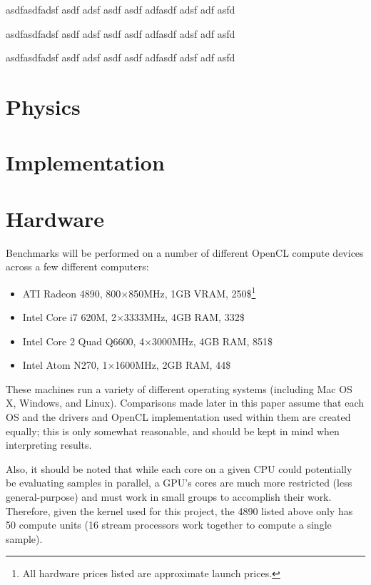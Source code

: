 \documentclass{acmsiggraph}
\begin{document}
asdfasdfadsf asdf adsf asdf asdf adfasdf adsf adf asfd

asdfasdfadsf asdf adsf asdf asdf adfasdf adsf adf asfd

asdfasdfadsf asdf adsf asdf asdf adfasdf adsf adf asfd

\section{Physics}

\section{Implementation}

\section{Hardware}

Benchmarks will be performed on a number of different OpenCL compute devices across a few different computers:

\begin{itemize}

\item ATI Radeon 4890, 800$\times$850MHz, 1GB VRAM, 250\$\footnote{All hardware prices listed are approximate launch prices.\label{fn:prices}}

\item Intel Core i7 620M, 2$\times$3333MHz, 4GB RAM, 332\$

\item Intel Core 2 Quad Q6600, 4$\times$3000MHz, 4GB RAM, 851\$

\item Intel Atom N270, 1$\times$1600MHz, 2GB RAM, 44\$

\end{itemize}

These machines run a variety of different operating systems (including Mac OS X, Windows, and Linux). Comparisons made later in this paper assume that each OS and the drivers and OpenCL implementation used within them are created equally; this is only somewhat reasonable, and should be kept in mind when interpreting results.

Also, it should be noted that while each core on a given CPU could potentially be evaluating samples in parallel, a GPU's cores are much more restricted (less general-purpose) and must work in small groups to accomplish their work. Therefore, given the kernel used for this project, the 4890 listed above only has 50 compute units (16 stream processors work together to compute a single sample).
\end{document}
